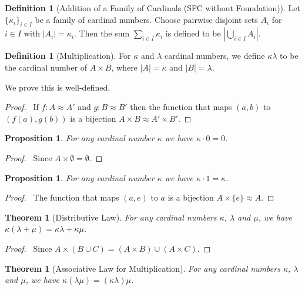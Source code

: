 \documentclass{book}
\let\qed\relax
\newtheorem{prop}[ax]{Proposition}
\newtheorem{thm}[ax]{Theorem}
\theoremstyle{definition}
\newtheorem{df}[ax]{Definition}
\begin{document}
\begin{df}[Addition of a Family of Cardinals (SFC without Foundation)]
Let $\{\kappa_i\}_{i \in I}$ be a family of cardinal numbers. Choose pairwise disjoint sets $A_i$ for $i \in I$ with $|A_i| = \kappa_i$. Then the sum $\sum_{i \in I} \kappa_i$ is defined to be $\left| \bigcup_{i \in I} A_i \right|$.
\end{df}

\begin{df}[Multiplication]
For $\kappa$ and $\lambda$ cardinal numbers, we define $\kappa \lambda$ to be the cardinal number of $A \times B$, where $|A| = \kappa$ and $|B| = \lambda$.

We prove this is well-defined.
\end{df}

\begin{proof}
\pf\ If $f : A \approx A'$ and $g : B \approx B'$ then the function that maps $(a,b)$ to $(f(a),g(b))$ is a bijection $A \times B \approx A' \times B'$. \qed
\end{proof}

\begin{prop}
For any cardinal number $\kappa$ we have $\kappa \cdot 0 = 0$.
\end{prop}

\begin{proof}
\pf\ Since $A \times \emptyset = \emptyset$. \qed
\end{proof}

\begin{prop}
\label{prop:multone}
For any cardinal number $\kappa$ we have $\kappa \cdot 1 = \kappa$.
\end{prop}

\begin{proof}
\pf\ The function that maps $(a,e)$ to $a$ is a bijection $A \times \{e\} \approx A$. \qed
\end{proof}

\begin{thm}[Distributive Law]
For any cardinal numbers $\kappa$, $\lambda$ and $\mu$, we have $\kappa(\lambda + \mu) = \kappa \lambda + \kappa \mu$.
\end{thm}

\begin{proof}
\pf\ Since $A \times (B \cup C) = (A \times B) \cup (A \times C)$. \qed
\end{proof}

\begin{thm}[Associative Law for Multiplication]
For any cardinal numbers $\kappa$, $\lambda$ and $\mu$, we have $\kappa (\lambda \mu) = (\kappa \lambda) \mu$.
\end{thm}
\end{document}

